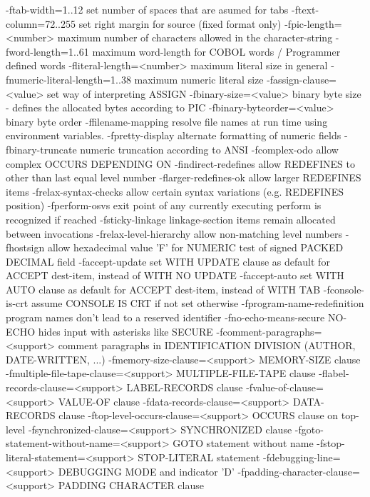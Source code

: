   -ftab-width=1..12    	set number of spaces that are asumed for tabs
  -ftext-column=72..255	set right margin for source (fixed format only)
  -fpic-length=<number>	maximum number of characters allowed in the character-string
  -fword-length=1..61  	maximum word-length for COBOL words / Programmer defined words
  -fliteral-length=<number>	maximum literal size in general
  -fnumeric-literal-length=1..38	maximum numeric literal size
  -fassign-clause=<value>	set way of interpreting ASSIGN
  -fbinary-size=<value>	binary byte size - defines the allocated bytes according to PIC
  -fbinary-byteorder=<value>	binary byte order
  -ffilename-mapping   	resolve file names at run time using environment variables.
  -fpretty-display     	alternate formatting of numeric fields
  -fbinary-truncate    	numeric truncation according to ANSI
  -fcomplex-odo        	allow complex OCCURS DEPENDING ON
  -findirect-redefines 	allow REDEFINES to other than last equal level number
  -flarger-redefines-ok	allow larger REDEFINES items
  -frelax-syntax-checks	allow certain syntax variations (e.g. REDEFINES position)
  -fperform-osvs       	exit point of any currently executing perform is recognized if reached
  -fsticky-linkage     	linkage-section items remain allocated between invocations
  -frelax-level-hierarchy	allow non-matching level numbers
  -fhostsign           	allow hexadecimal value 'F' for NUMERIC test of signed PACKED DECIMAL field
  -faccept-update      	set WITH UPDATE clause as default for ACCEPT dest-item, instead of WITH NO UPDATE
  -faccept-auto        	set WITH AUTO clause as default for ACCEPT dest-item, instead of WITH TAB
  -fconsole-is-crt     	assume CONSOLE IS CRT if not set otherwise
  -fprogram-name-redefinition	program names don't lead to a reserved identifier
  -fno-echo-means-secure	NO-ECHO hides input with asterisks like SECURE
  -fcomment-paragraphs=<support>	comment paragraphs in IDENTIFICATION DIVISION (AUTHOR, DATE-WRITTEN, ...)
  -fmemory-size-clause=<support>	MEMORY-SIZE clause
  -fmultiple-file-tape-clause=<support>	MULTIPLE-FILE-TAPE clause
  -flabel-records-clause=<support>	LABEL-RECORDS clause
  -fvalue-of-clause=<support>	VALUE-OF clause
  -fdata-records-clause=<support>	DATA-RECORDS clause
  -ftop-level-occurs-clause=<support>	OCCURS clause on top-level
  -fsynchronized-clause=<support>	SYNCHRONIZED clause
  -fgoto-statement-without-name=<support>	GOTO statement without name
  -fstop-literal-statement=<support>	STOP-LITERAL statement
  -fdebugging-line=<support>	DEBUGGING MODE and indicator 'D'
  -fpadding-character-clause=<support>	PADDING CHARACTER clause

